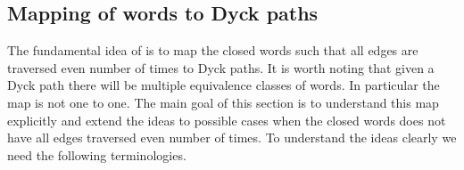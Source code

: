 \documentclass[12pt]{article}
\numberwithin{equation}{section}
\numberwithin{equation}{section}
\theoremstyle{definition}
\renewcommand{\1}{\bf 1}
\begin{document}
 \subsection{Mapping of words to Dyck paths}
 The fundamental idea of \citet{sosh} is to map the closed words such that all edges are traversed even number of times to Dyck paths. It is worth noting that given a Dyck path there will be multiple equivalence classes of words. In particular the map is not one to one. The main goal of this section is to understand this map explicitly and extend the ideas to possible cases when the closed words does not have all edges traversed even number of times. To understand the ideas clearly we need the following terminologies.
 
\end{document}
